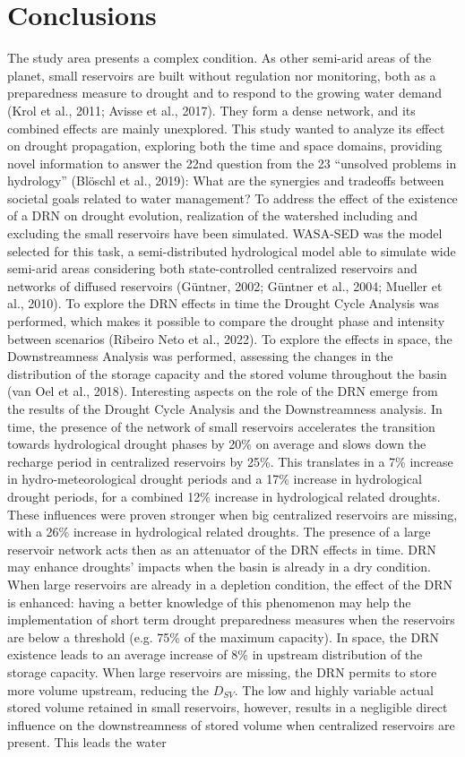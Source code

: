 \documentclass[draft]{agujournal2019}
\begin{document}
\section{Conclusions}
The study area presents a complex condition. As other semi-arid areas of the planet, small reservoirs are built without regulation nor monitoring, both as a preparedness measure to drought and to respond to the growing water demand (Krol et al., 2011; Avisse et al., 2017). They form a dense network, and its combined effects are mainly unexplored. This study wanted to analyze its effect on drought propagation, exploring both the time and space domains, providing novel information to answer the 22nd question from the 23 “unsolved problems in hydrology” (Blöschl et al., 2019): What are the synergies and tradeoffs between societal goals related to water management?
To address the effect of the existence of a DRN on drought evolution, realization of the watershed including and excluding the small reservoirs have been simulated. WASA-SED was the model selected for this task, a semi-distributed hydrological model able to simulate wide semi-arid areas considering both state-controlled centralized reservoirs and networks of diffused reservoirs (Güntner, 2002; Güntner et al., 2004; Mueller et al., 2010). To explore the DRN effects in time the Drought Cycle Analysis was performed, which makes it possible to compare the drought phase and intensity between scenarios (Ribeiro Neto et al., 2022). To explore the effects in space, the Downstreamness Analysis was performed, assessing the changes in the distribution of the storage capacity and the stored volume throughout the basin (van Oel et al., 2018). Interesting aspects on the role of the DRN emerge from the results of the Drought Cycle Analysis and the Downstreamness analysis. In time, the presence of the network of small reservoirs accelerates the transition towards hydrological drought phases by 20\% on average and slows down the recharge period in centralized reservoirs by 25\%. This translates in a 7\% increase in hydro-meteorological drought periods and a 17\% increase in hydrological drought periods, for a combined 12\% increase in hydrological related droughts. These influences were proven stronger when big centralized reservoirs are missing, with a 26\% increase in hydrological related droughts. The presence of a large reservoir network acts then as an attenuator of the DRN effects in time. DRN may enhance droughts' impacts when the basin is already in a dry condition. When large reservoirs are already in a depletion condition, the effect of the DRN is enhanced: having a better knowledge of this phenomenon may help the implementation of short term drought preparedness measures when the reservoirs are below a threshold (e.g. 75\% of the maximum capacity). In space, the DRN existence leads to an average increase of 8\% in upstream distribution of the storage capacity. When large reservoirs are missing, the DRN permits to store more volume upstream, reducing the $D_{SV}$. The low and highly variable actual stored volume retained in small reservoirs, however, results in a negligible direct influence on the downstreamness of stored volume when centralized reservoirs are present. This leads the water 
\end{document}
